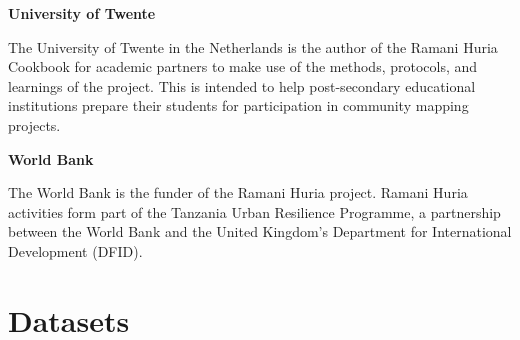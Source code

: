 \documentclass[a4paper,12pt,twoside]{article}
\begin{document}
\textbf{University of Twente}


The University of Twente in the Netherlands is the author of the Ramani Huria Cookbook for academic partners to make use of the methods, protocols, and learnings of the project. This is intended to help post-secondary educational institutions prepare their students for participation in community mapping projects. 

\textbf{World Bank}


The World Bank is the funder of the Ramani Huria project. Ramani Huria activities form part of the Tanzania Urban Resilience Programme, a partnership between the World Bank and the United Kingdom’s Department for International Development (DFID).

\newpage
\section{Datasets}
\end{document}
